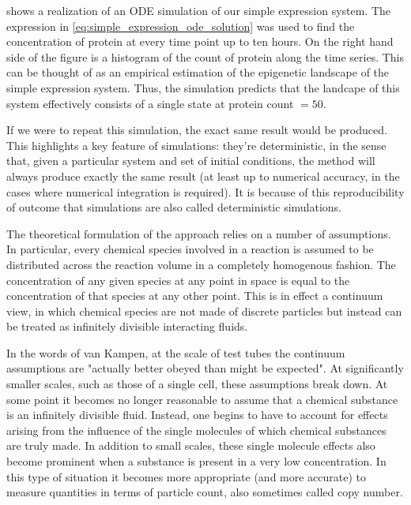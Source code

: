  shows a realization of an ODE simulation of our simple expression system. The expression in \eqref{eq:simple_expression_ode_solution} was used to find the concentration of protein at every time point up to ten hours. On the right hand side of the figure is a histogram of the count of protein along the time series. This can be thought of as an empirical estimation of the epigenetic landscape of the simple expression system. Thus, the  simulation predicts that the landcape of this system effectively consists of a single state at protein count $= 50$.

If we were to repeat this simulation, the exact same result would be produced. This highlights a key feature of  simulations: they're deterministic, in the sense that, given a particular system and set of initial conditions, the method will always produce exactly the same result (at least up to numerical accuracy, in the cases where numerical integration is required). It is because of this reproducibility of outcome that  simulations are also called deterministic simulations.


The theoretical formulation of the  approach relies on a number of assumptions\cite{Gillespie:2007bx}. In particular, every chemical species involved in a reaction is assumed to be distributed across the reaction volume in a completely homogenous fashion. The concentration of any given species at any point in space is equal to the concentration of that species at any other point. This is in effect a continuum view, in which chemical species are not made of discrete particles but instead can be treated as infinitely divisible interacting fluids.

In the words of van Kampen, at the scale of test tubes the continuum assumptions are "actually better obeyed than might be expected"\cite{VanKampen:2011vs}. At significantly smaller scales, such as those of a single cell, these assumptions break down. At some point it becomes no longer reasonable to assume that a chemical substance is an infinitely divisible fluid. Instead, one begins to have to account for effects\cite{Goutsias:2013gz} arising from the influence of the single molecules of which chemical substances are truly made. In addition to small scales, these single molecule effects also become prominent when a substance is present in a very low concentration. In this type of situation it becomes more appropriate (and more accurate) to measure quantities in terms of particle count, also sometimes called copy number.

